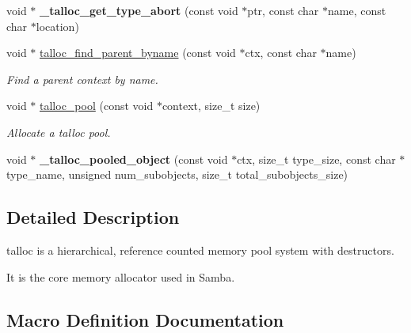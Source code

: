 \begin{DoxyCompactItemize}
\item 
\hypertarget{group__talloc_gac4e82f4d46ccddb27bc1101e10c66b59}{}void $\ast$ {\bfseries \+\_\+talloc\+\_\+get\+\_\+type\+\_\+abort} (const void $\ast$ptr, const char $\ast$name, const char $\ast$location)\label{group__talloc_gac4e82f4d46ccddb27bc1101e10c66b59}

\item 
void $\ast$ \hyperlink{group__talloc_gaa5dee9fd4d8d4700f14ea4dd92cd4f14}{talloc\+\_\+find\+\_\+parent\+\_\+byname} (const void $\ast$ctx, const char $\ast$name)
\begin{DoxyCompactList}\small\item\em Find a parent context by name. \end{DoxyCompactList}\item 
void $\ast$ \hyperlink{group__talloc_ga454194769421483dbd512f26c622f713}{talloc\+\_\+pool} (const void $\ast$context, size\+\_\+t size)
\begin{DoxyCompactList}\small\item\em Allocate a talloc pool. \end{DoxyCompactList}\item 
\hypertarget{group__talloc_ga77a2717f102c41c6ef4bc2d656c92096}{}void $\ast$ {\bfseries \+\_\+talloc\+\_\+pooled\+\_\+object} (const void $\ast$ctx, size\+\_\+t type\+\_\+size, const char $\ast$type\+\_\+name, unsigned num\+\_\+subobjects, size\+\_\+t total\+\_\+subobjects\+\_\+size)\label{group__talloc_ga77a2717f102c41c6ef4bc2d656c92096}

\end{DoxyCompactItemize}


\subsection{Detailed Description}
talloc is a hierarchical, reference counted memory pool system with destructors. 

It is the core memory allocator used in Samba. 

\subsection{Macro Definition Documentation}
\hypertarget{group__talloc_ga2b3203a43d49423d064e1d889f6c584d}{}
